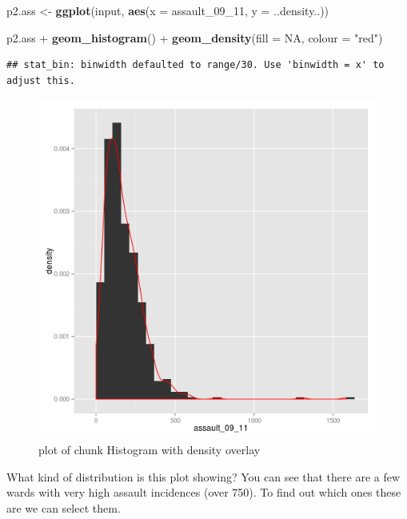 \documentclass[]{article}
\makeatletter
\newenvironment{Shaded}{}{}
\newcommand{\KeywordTok}[1]{\textcolor[rgb]{0.00,0.44,0.13}{\textbf{{#1}}}}
\newcommand{\DataTypeTok}[1]{\textcolor[rgb]{0.56,0.13,0.00}{{#1}}}
\newcommand{\StringTok}[1]{\textcolor[rgb]{0.25,0.44,0.63}{{#1}}}
\newcommand{\OtherTok}[1]{\textcolor[rgb]{0.00,0.44,0.13}{{#1}}}
\newcommand{\NormalTok}[1]{{#1}}
\def\maxwidth{\ifdim\Gin@nat@width>\linewidth\linewidth
\else\Gin@nat@width\fi}
\let\Oldincludegraphics\includegraphics
\renewcommand{\includegraphics}[1]{\Oldincludegraphics[width=\maxwidth]{#1}}
\makeatother
\begin{document}
\begin{Shaded}
\begin{Highlighting}[]
\NormalTok{p2.ass <- }\KeywordTok{ggplot}\NormalTok{(input, }\KeywordTok{aes}\NormalTok{(}\DataTypeTok{x =} \NormalTok{assault_09_11, }\DataTypeTok{y =} \NormalTok{..density..))}

\NormalTok{p2.ass + }\KeywordTok{geom_histogram}\NormalTok{() + }\KeywordTok{geom_density}\NormalTok{(}\DataTypeTok{fill =} \OtherTok{NA}\NormalTok{, }\DataTypeTok{colour =} \StringTok{"red"}\NormalTok{)}
\end{Highlighting}
\end{Shaded}
\begin{verbatim}
## stat_bin: binwidth defaulted to range/30. Use 'binwidth = x' to adjust this.
\end{verbatim}
\begin{figure}[htbp]
\centering
\includegraphics{figure/Histogram_with_density_overlay.png}
\caption{plot of chunk Histogram with density overlay}
\end{figure}

What kind of distribution is this plot showing? You can see that there
are a few wards with very high assault incidences (over 750). To find
out which ones these are we can select them.
\end{document}
